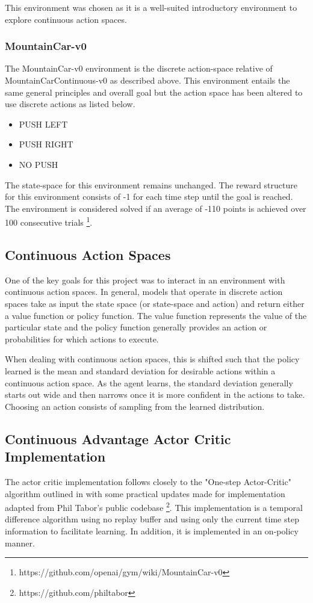 \documentclass[conference]{IEEEtran}
\begin{document}
This environment was chosen as it is a well-suited introductory environment to explore continuous action spaces.

\subsubsection{MountainCar-v0}
The MountainCar-v0 environment is the discrete action-space relative of MountainCarContinuous-v0 as described above.
This environment entails the same general principles and overall goal but the action space has been altered to use discrete actions as listed below.

\begin{itemize}
    \item PUSH LEFT
    \item PUSH RIGHT
    \item NO PUSH
\end{itemize}

The state-space for this environment remains unchanged.
The reward structure for this environment consists of -1 for each time step until the goal is reached.
The environment is considered solved if an average of -110 points is achieved over 100 consecutive trials \footnote{https://github.com/openai/gym/wiki/MountainCar-v0}.

\subsection{Continuous Action Spaces}
One of the key goals for this project was to interact in an environment with continuous action spaces.
In general, models that operate in discrete action spaces take as input the state space (or state-space and action) and return either a value function or policy function.
The value function represents the value of the particular state and the policy function generally provides an action or probabilities for which actions to execute.

When dealing with continuous action spaces, this is shifted such that the policy learned is the mean and standard deviation for desirable actions within a continuous action space.
As the agent learns, the standard deviation generally starts out wide and then narrows once it is more confident in the actions to take.
Choosing an action consists of sampling from the learned distribution.

\subsection{Continuous Advantage Actor Critic Implementation}
The actor critic implementation follows closely to the "One-step Actor-Critic" algorithm outlined in \cite{ReinforcementLearningBook} with some practical updates made for implementation adapted from Phil Tabor's public codebase \footnote{https://github.com/philtabor}.
This implementation is a temporal difference algorithm using no replay buffer and using only the current time step information to facilitate learning.
In addition, it is implemented in an on-policy manner.
\end{document}
